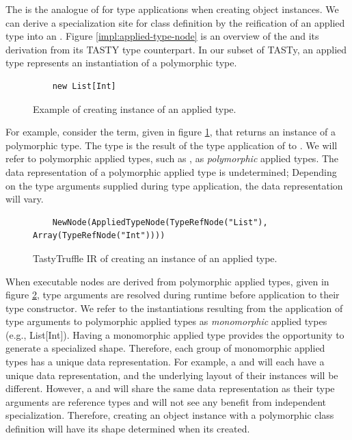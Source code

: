 The  is the analogue of  for type applications when creating object instances.
We can derive a specialization site for class definition by the reification of an applied type into an .
Figure \ref{impl:applied-type-node} is an overview of the  and its derivation from its TASTY type counterpart.
In our subset of TASTy, an applied type represents an instantiation of a polymorphic type.

\begin{figure}[!htb]
	\begin{verbatim}
	new List[Int]
	\end{verbatim}
	\caption{Example of creating instance of an applied type.}
	\label{example:applied-type}
\end{figure}

For example, consider the term, given in figure \ref{example:applied-type}, that returns an instance of a polymorphic type.
The type  is the result of the type application of  to .
We will refer to polymorphic applied types, such as , as \textit{polymorphic} applied types. 
The data representation of a polymorphic applied type is undetermined; Depending on the type arguments supplied during type application, the data representation will vary.

\begin{figure}[!htb]
	\begin{verbatim}
	NewNode(AppliedTypeNode(TypeRefNode("List"), Array(TypeRefNode("Int"))))
	\end{verbatim}
	\caption{TastyTruffle IR of creating an instance of an applied type.}
	\label{example:applied-type-node}
\end{figure}

When executable nodes are derived from polymorphic applied types, given in figure \ref{example:applied-type-node}, type arguments are resolved during runtime before application to their type constructor.
We refer to the instantiations resulting from the application of type arguments to polymorphic applied types as \textit{monomorphic} applied types (e.g., List[Int]).
Having a monomorphic applied type provides the opportunity to generate a specialized shape.
Therefore, each group of monomorphic applied types has a unique data representation.
For example, a  and  will each have a unique data representation, and the underlying layout of their instances will be different.
However, a  and  will share the same data representation as their type arguments are reference types and will not see any benefit from independent specialization.
Therefore, creating an object instance with a polymorphic class definition will have its shape determined when its created.

